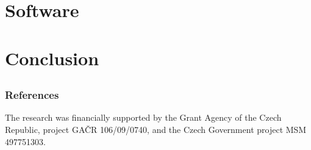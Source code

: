\documentclass[10pt,t]{beamer}
\begin{document}
\section{Software}

\subsection*{}



\section{Conclusion}

\subsection*{}

\nocite{cimrman_et_al_2009:_sfepy}
\nocite{cimrman_rohan_2007:_modelling_parallel_diffusion}
\nocite{griso_rohan_2007:_homogenization_diffusion_deformation}
\nocite{rohan_2006:_modelling_large_deformation}
\nocite{rohan08:_homog_model_of_bone_poroel}
\nocite{rohan09:_multis_model_of_fluid_satur}

\begin{frame}[allowframebreaks]
  \frametitle{References}
  {\small The research was financially supported by the Grant Agency of the
    Czech Republic, project GA\v{C}R 106/09/0740, and the Czech Government
    project MSM 497751303.}

  \hrulefill
  \tiny
  
\end{frame}
\end{document}
